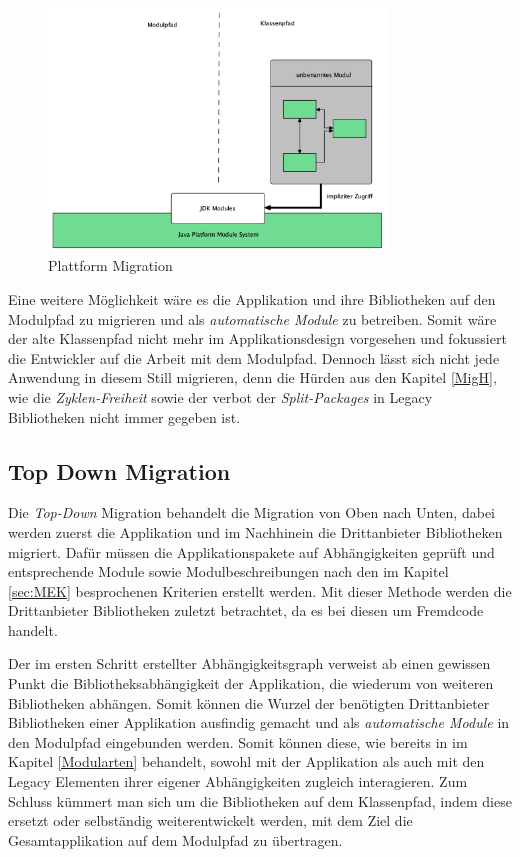 	\begin{figure}[h]
		\centering
	    \includegraphics[width=0.8\textwidth]{material/images/plattform-migration.png}
	    \caption{Plattform Migration}
	    \label{fig:PM}
  	\end{figure}

	Eine weitere Möglichkeit wäre es die Applikation und ihre Bibliotheken auf den Modulpfad zu migrieren und als \textit{automatische Module} zu betreiben. Somit wäre der alte Klassenpfad  nicht mehr im Applikationsdesign vorgesehen und fokussiert die Entwickler auf die Arbeit mit dem Modulpfad. Dennoch lässt sich nicht jede Anwendung in diesem Still migrieren, denn die Hürden aus den Kapitel \ref{MigH}, wie die \textit{Zyklen-Freiheit} sowie der verbot der \textit{Split-Packages} in Legacy Bibliotheken nicht immer gegeben ist. 



\subsection{Top Down Migration}

	Die \textit{Top-Down} Migration behandelt die Migration von Oben nach Unten, dabei werden zuerst die Applikation und im Nachhinein die Drittanbieter Bibliotheken migriert. Dafür müssen die Applikationspakete auf Abhängigkeiten geprüft und entsprechende Module sowie Modulbeschreibungen nach den im Kapitel \ref{sec:MEK} besprochenen Kriterien erstellt werden. Mit dieser Methode werden die Drittanbieter Bibliotheken zuletzt betrachtet, da es bei diesen um Fremdcode handelt. 


	Der im ersten Schritt erstellter Abhängigkeitsgraph verweist ab einen gewissen Punkt die Bibliotheksabhängigkeit der Applikation, die wiederum von weiteren Bibliotheken abhängen. Somit können die Wurzel der benötigten Drittanbieter Bibliotheken einer Applikation ausfindig gemacht und als \textit{automatische Module} in den Modulpfad eingebunden werden. Somit können diese, wie bereits in im Kapitel \ref{Modularten} behandelt, sowohl mit der Applikation als auch mit den Legacy Elementen ihrer eigener Abhängigkeiten zugleich interagieren. Zum Schluss kümmert man sich um die Bibliotheken auf dem Klassenpfad, indem diese ersetzt oder selbständig weiterentwickelt werden, mit dem Ziel die Gesamtapplikation auf dem Modulpfad zu übertragen. \bigbreak

